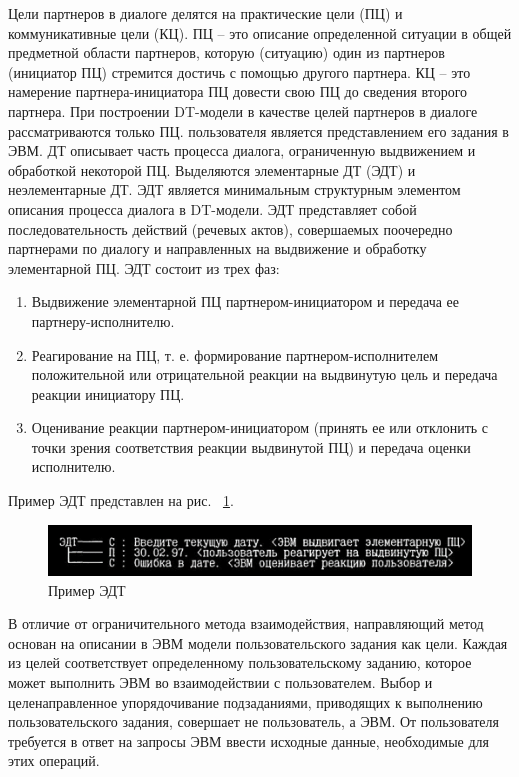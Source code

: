 Цели партнеров в диалоге делятся на практические цели (ПЦ) и коммуникативные цели (КЦ). ПЦ -- это описание определенной ситуации в общей предметной области партнеров, которую (ситуацию) один из партнеров (инициатор ПЦ) стремится достичь с помощью другого партнера. КЦ -- это намерение партнера-инициатора ПЦ довести свою ПЦ до сведения второго партнера. При построении DT-модели в качестве целей партнеров в диалоге рассматриваются только ПЦ. пользователя является представлением его задания в ЭВМ. ДТ описывает часть процесса диалога, ограниченную выдвижением и обработкой некоторой ПЦ. Выделяются элементарные ДТ (ЭДТ) и неэлементарные ДТ. ЭДТ является минимальным структурным элементом описания процесса диалога в DT-модели. ЭДТ представляет собой последовательность действий (речевых актов), совершаемых поочередно партнерами по диалогу и направленных на выдвижение и обработку элементарной ПЦ. ЭДТ состоит из трех фаз:
\begin{enumerate}
	\item Выдвижение элементарной ПЦ партнером-инициатором и передача ее партнеру-исполнителю.
	\item Реагирование на ПЦ, т. е. формирование партнером-исполнителем положительной или отрицательной реакции на выдвинутую цель и передача реакции инициатору ПЦ.
	\item Оценивание реакции партнером-инициатором (принять ее или отклонить с точки зрения соответствия реакции выдвинутой ПЦ) и передача оценки исполнителю.
\end{enumerate}

Пример ЭДТ представлен на рис. ~\ref{example}.

\begin{figure}[!ht]
  \centering
  \includegraphics[scale=0.8]{ResearchNotes/rndhpc_not_gui_2022_10_10/example.png}
  \caption{Пример ЭДТ}
  \label{example}
\end{figure}

В отличие от ограничительного метода взаимодействия, направляющий метод основан на описании в ЭВМ модели пользовательского задания как цели. Каждая из целей соответствует определенному пользовательскому заданию, которое может выполнить ЭВМ во взаимодействии с пользователем. Выбор и целенаправленное упорядочивание подзаданиями, приводящих к выполнению пользовательского задания, совершает не пользователь, а ЭВМ. От пользователя требуется в ответ на запросы ЭВМ ввести исходные данные, необходимые для этих операций.

